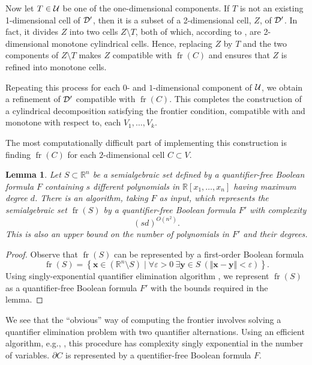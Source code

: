 \documentclass[
]{book}
\newtheorem{lemma}{Lemma}[chapter]
\theoremstyle{definition}
\theoremstyle{definition}
\theoremstyle{definition}
\theoremstyle{definition}
\theoremstyle{remark}
\begin{document}
Now let \(T \in {\cal U}\) be one of the one-dimensional components. If \(T\) is not an existing 1-dimensional cell of \(\cal D'\), then it is a subset of a 2-dimensional cell, \(Z\), of \(\cal D'\). In fact, it divides \(Z\) into two cells \(Z \setminus T\), both of which, according to \citep[Theorem 11]{bgv13}, are 2-dimensional monotone cylindrical cells. Hence, replacing \(Z\) by \(T\) and the two components of \(Z \setminus T\) makes \(Z\) compatible with \({\operatorname{fr} \left( C \right)}\) and ensures that \(Z\) is refined into monotone cells.

Repeating this process for each \(0\)- and \(1\)-dimensional component of \(\cal U\), we obtain a refinement of \(\cal D'\) compatible with \({\operatorname{fr} \left( C \right)}\).
This completes the construction of a cylindrical decomposition satisfying the frontier condition, compatible with and monotone with respect to, each \(V_1,\ldots,V_k\).

The most computationally difficult part of implementing this construction is finding \({\operatorname{fr} \left( C \right)}\) for each \(2\)-dimensional cell \(C \subset V\).

\begin{lemma}
Let \(S \subset \mathbb{R}^n\) be a semialgebraic set defined by a quantifier-free Boolean formula \(F\)
containing \(s\) different polynomials in \(\mathbb{R}[x_1, \ldots ,x_n]\) having maximum degree \(d\).
There is an algorithm, taking \(F\) as input, which represents the semialgebraic set \({\operatorname{fr} \left(  S  \right)}\) by a quantifier-free Boolean formula \(F'\) with complexity
\[(sd)^{O(n^2)}.
\]
This is also an upper bound on the number of polynomials in \(F'\) and their degrees.
\end{lemma}

\begin{proof}
Observe that \({\operatorname{fr} \left(  S  \right)}\) can be represented by a first-order Boolean formula
\[
{\operatorname{fr} \left(  S  \right)} = \left\{ \mathbf{x} \in (\mathbb{R}^n \setminus S) \mid \forall \varepsilon >0\> \exists \mathbf{y} \in S\> (\Vert \mathbf{x} - \mathbf{y} \Vert < \varepsilon ) \right\}.
\]
Using singly-exponential quantifier elimination algorithm \citep[ Algorithm 14.21]{bpr2006}, we represent \({\operatorname{fr} \left(  S  \right)}\)
as a quantifier-free Boolean formula \(F'\) with the bounds required in the lemma.
\end{proof}

We see that the ``obvious'' way of computing the frontier involves solving a quantifier elimination problem with two quantifier alternations. Using an efficient algorithm, e.g., \citep[Algorithm 14.21]{bpr2006}, this procedure has complexity singly exponential in the number of variables. \(\partial C\) is represented by a quentifier-free Boolean formula \(F\).
\end{document}
